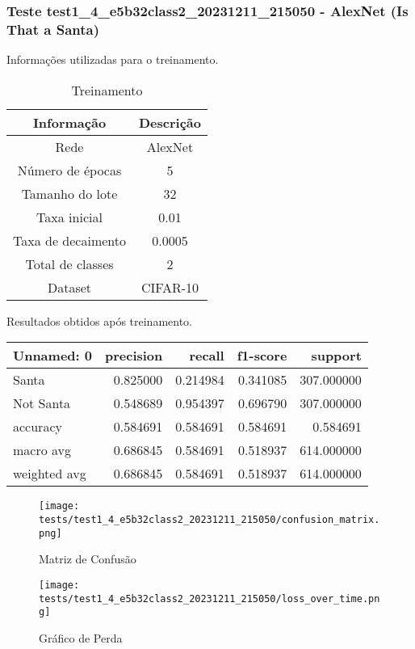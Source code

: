 \subsubsection{Teste test1_4_e5b32class2_20231211_215050 - AlexNet (Is That a Santa)}

Informações utilizadas para o treinamento.

\begin{table}[ht]
   \centering
   \caption{Treinamento}
   \label{tab:modelos}
   \begin{tabular}{| c | c | }
      \hline 
      \textbf{Informação} & \textbf{Descrição} \\
      \hline \hline 
      Rede & AlexNet \\
      \hline
      Número de épocas & 5\\
      \hline
      Tamanho do lote & 32\\
      \hline
      Taxa inicial & 0.01 \\
      \hline
      Taxa de decaimento & 0.0005 \\
      \hline
      Total de classes & 2\\
      \hline
      Dataset & CIFAR-10\\
      \hline
   \end{tabular} 
\end{table}

Resultados obtidos após treinamento.

\begin{tabular}{lrrrr}
\toprule
  Unnamed: 0 &  precision &   recall &  f1-score &    support \\
\midrule
       Santa &   0.825000 & 0.214984 &  0.341085 & 307.000000 \\
   Not Santa &   0.548689 & 0.954397 &  0.696790 & 307.000000 \\
    accuracy &   0.584691 & 0.584691 &  0.584691 &   0.584691 \\
   macro avg &   0.686845 & 0.584691 &  0.518937 & 614.000000 \\
weighted avg &   0.686845 & 0.584691 &  0.518937 & 614.000000 \\
\bottomrule
\end{tabular}


\begin{figure}[ht]
 \begin{center}
   \texttt{[image: tests/test1\_4\_e5b32class2\_20231211\_215050/confusion\_matrix.png]}
  \caption{Matriz de Confusão}
  \label{fig:fig03}
 \end{center}
\end{figure}

\begin{figure}[ht]
 \begin{center}
   \texttt{[image: tests/test1\_4\_e5b32class2\_20231211\_215050/loss\_over\_time.png]}
  \caption{Gráfico de Perda}
  \label{fig:fig04}
 \end{center}
\end{figure}
